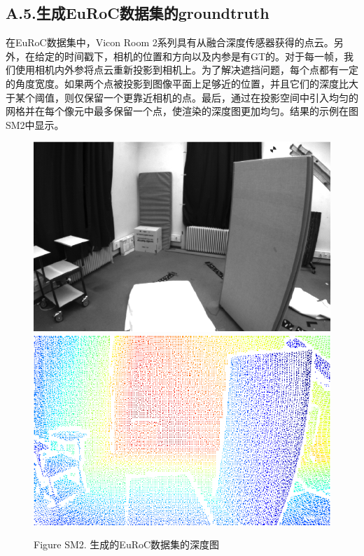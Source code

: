 \documentclass[10pt,journal,compsoc,UTF8]{IEEEtran}
\begin{document}
\subsection*{A.5.生成EuRoC数据集的groundtruth}
在EuRoC数据集中，Vicon Room 2系列具有从融合深度传感器获得的点云。另外，在给定的时间戳下，相机的位置和方向以及内参是有GT的。对于每一帧，我们使用相机内外参将点云重新投影到相机上。为了解决遮挡问题，每个点都有一定的角度宽度。如果两个点被投影到图像平面上足够近的位置，并且它们的深度比大于某个阈值，则仅保留一个更靠近相机的点。最后，通过在投影空间中引入均匀的网格并在每个像元中最多保留一个点，使渲染的深度图更加均匀。结果的示例在图SM2中显示。
\begin{figure}[htbp]
  \centering
    \includegraphics[width=1\linewidth]{imgs/SM2a.png}\\
    \includegraphics[width=1\linewidth]{imgs/SM2b.png}
  \caption*{Figure SM2. 生成的EuRoC数据集的深度图}
  
\end{figure}
\end{document}
